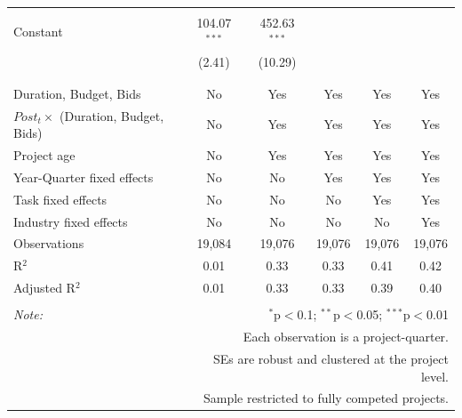 \documentclass[
]{article}
\begin{document}
\begin{table}[H]
\begin{tabular}{@{\extracolsep{-2pt}}lccccc}
  & & & & & \\ 
 Constant & 104.07$^{***}$ & 452.63$^{***}$ &  &  &  \\ 
  & (2.41) & (10.29) &  &  &  \\ 
  & & & & & \\ 
\hline \\[-1.8ex] 
Duration, Budget, Bids & No & Yes & Yes & Yes & Yes \\ 
$Post_t \times $  (Duration, Budget, Bids) & No & Yes & Yes & Yes & Yes \\ 
Project age & No & Yes & Yes & Yes & Yes \\ 
Year-Quarter fixed effects & No & No & Yes & Yes & Yes \\ 
Task fixed effects & No & No & No & Yes & Yes \\ 
Industry fixed effects & No & No & No & No & Yes \\ 
Observations & 19,084 & 19,076 & 19,076 & 19,076 & 19,076 \\ 
R$^{2}$ & 0.01 & 0.33 & 0.33 & 0.41 & 0.42 \\ 
Adjusted R$^{2}$ & 0.01 & 0.33 & 0.33 & 0.39 & 0.40 \\ 
\hline 
\hline \\[-1.8ex] 
\textit{Note:}  & \multicolumn{5}{r}{$^{*}$p$<$0.1; $^{**}$p$<$0.05; $^{***}$p$<$0.01} \\ 
 & \multicolumn{5}{r}{Each observation is a project-quarter.} \\ 
 & \multicolumn{5}{r}{SEs are robust and clustered at the project level.} \\ 
 & \multicolumn{5}{r}{Sample restricted to fully competed projects.} \\ 
\end{tabular} 
\end{table}
\end{document}
